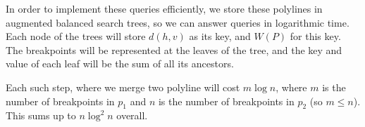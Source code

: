 \documentclass[11pt,a4paper]{article}
\theoremstyle{definition}
\theoremstyle{remark}
\begin{document}
In order to implement these queries efficiently, we store these polylines in augmented balanced search trees, so we can answer queries in logarithmic time. Each node of the trees will store $d(h,v)$ as its key, and $W(P)$ for this key. The breakpoints will be represented at the leaves of the tree, and the key and value of each leaf will be the sum of all its ancestors.

Each such step, where we merge two polyline will cost $m \log n$, where $m$ is the number of breakpoints in $p_1$ and $n$ is the number of breakpoints in $p_2$ (so $m \leq n$). This sums up to $n \log^2 n$ overall.



\end{document}
